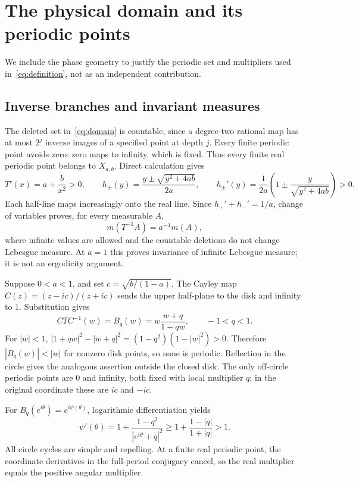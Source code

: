 \section{The physical domain and its periodic points}\label{sec:dynamics}

We include the phase geometry to justify the periodic set and multipliers used
in~\eqref{eq:definition}, not as an independent contribution.

\subsection{Inverse branches and invariant measures}

The deleted set in~\eqref{eq:domain} is countable, since a degree-two rational
map has at most $2^j$ inverse images of a specified point at depth $j$. Every
finite periodic point avoids zero: zero maps to infinity, which is fixed.
Thus every finite real periodic point belongs to $X_{a,b}$. Direct calculation
gives
\begin{equation}\label{eq:inverse}
 T'(x)=a+\frac b{x^2}>0,\qquad
 h_\pm(y)=\frac{y\pm\sqrt{y^2+4ab}}{2a},\qquad
 h_\pm'(y)=\frac1{2a}\left(1\pm\frac y{\sqrt{y^2+4ab}}\right)>0.
\end{equation}
Each half-line maps increasingly onto the real line. Since
$h_+'+h_-'=1/a$, change of variables proves, for every measurable $A$,
\begin{equation}\label{eq:jacobian}
 m(T^{-1}A)=a^{-1}m(A),
\end{equation}
where infinite values are allowed and the countable deletions do not change
Lebesgue measure. At $a=1$ this proves invariance of infinite Lebesgue measure;
it is not an ergodicity argument.

Suppose $0<a<1$, and set $c=\sqrt{b/(1-a)}$. The Cayley map
$C(z)=(z-ic)/(z+ic)$ sends the upper half-plane to the disk and infinity to $1$.
Substitution gives
\begin{equation}\label{eq:blaschke}
 C T C^{-1}(w)=B_q(w)=w\frac{w+q}{1+qw},\qquad -1<q<1.
\end{equation}
For $|w|<1$,
$|1+qw|^2-|w+q|^2=(1-q^2)(1-|w|^2)>0$.
Therefore $|B_q(w)|<|w|$ for nonzero disk points, so none is periodic.
Reflection in the circle gives the analogous assertion outside the closed
disk. The only off-circle periodic points are $0$ and infinity, both fixed
with local multiplier $q$; in the original coordinate these are $ic$ and
$-ic$.

For $B_q(e^{i\theta})=e^{i\psi(\theta)}$, logarithmic differentiation yields
\begin{equation}\label{eq:angular}
 \psi'(\theta)=1+\frac{1-q^2}{|e^{i\theta}+q|^2}
 \ge1+\frac{1-|q|}{1+|q|}>1.
\end{equation}
All circle cycles are simple and repelling. At a finite real periodic point,
the coordinate derivatives in the full-period conjugacy cancel, so the real
multiplier equals the positive angular multiplier.

